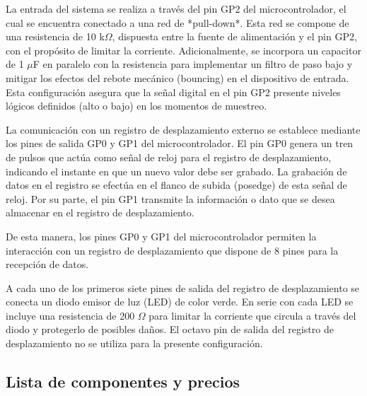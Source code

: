 \documentclass[12pt,a4paper]{article}
\begin{document}
La entrada del sistema se realiza a través del pin GP2 del
microcontrolador, el cual se encuentra conectado a una red
de *pull-down*. Esta red se compone de una resistencia de
10 k$\Omega$, dispuesta entre la fuente de alimentación y el pin
GP2, con el propósito de limitar la corriente.
Adicionalmente, se incorpora un capacitor de 1 $\mu$F en
paralelo con la resistencia para implementar un filtro de
paso bajo y mitigar los efectos del rebote mecánico
(bouncing) en el dispositivo de entrada. Esta configuración
asegura que la señal digital en el pin GP2 presente niveles
lógicos definidos (alto o bajo) en los momentos de
muestreo.

La comunicación con un registro de desplazamiento externo se
establece mediante los pines de salida GP0 y GP1 del
microcontrolador. El pin GP0 genera un tren de pulsos que
actúa como señal de reloj para el registro de
desplazamiento, indicando el instante en que un nuevo valor
debe ser grabado. La grabación de datos en el registro se
efectúa en el flanco de subida (posedge) de esta señal de
reloj. Por su parte, el pin GP1 transmite la información o
dato que se desea almacenar en el registro de
desplazamiento.

De esta manera, los pines GP0 y GP1 del microcontrolador
permiten la interacción con un registro de desplazamiento
que dispone de 8 pines para la recepción de datos.

A cada uno de los primeros siete pines de salida del
registro de desplazamiento se conecta un diodo emisor de
luz (LED) de color verde. En serie con cada LED se incluye
una resistencia de 200 $\Omega$ para limitar la corriente que
circula a través del diodo y protegerlo de posibles daños.
El octavo pin de salida del registro de desplazamiento no se
utiliza para la presente configuración.


\subsection{Lista de componentes y precios}
\end{document}
